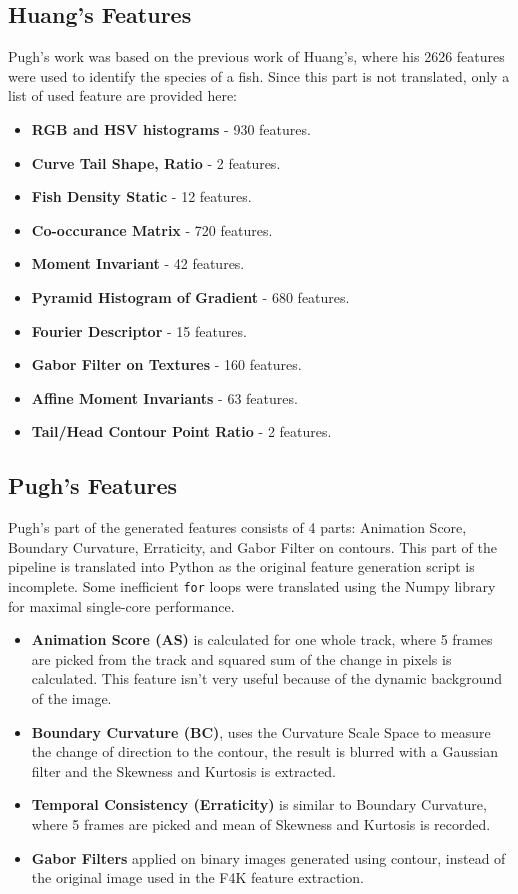 \documentclass[bsc,frontabs,twoside,fullspacing,parskip,deptreport]{infthesis}
\begin{document}
\subsection{Huang's Features}

Pugh's work was based on the previous work of Huang's\cite{Huang}, where his 2626 features were used to identify the species of a fish.
Since this part is not translated, only a list of used feature are provided here:
\begin{itemize}
\setlength{\parskip}{1pt}
\item \textbf{RGB and HSV histograms} - 930 features.
\item \textbf{Curve Tail Shape, Ratio} - 2 features.
\item \textbf{Fish Density Static} - 12 features.
\item \textbf{Co-occurance Matrix} - 720 features.
\item \textbf{Moment Invariant} - 42 features.
\item \textbf{Pyramid Histogram of Gradient} - 680 features.
\item \textbf{Fourier Descriptor} - 15 features.
\item \textbf{Gabor Filter on Textures} - 160 features.
\item \textbf{Affine Moment Invariants} - 63 features.
\item \textbf{Tail/Head Contour Point Ratio} - 2 features.
\end{itemize}

\subsection{Pugh's Features}

Pugh's part of the generated features consists of 4 parts: Animation Score, Boundary Curvature, Erraticity, and Gabor Filter on contours. 
This part of the pipeline is translated into Python as the original feature generation script is incomplete. Some inefficient {\tt for} loops were translated using the Numpy library for maximal single-core performance.

\begin{itemize}
\setlength{\parskip}{1pt}
\item
\textbf{Animation Score (AS)} is calculated for one whole track, where 5 frames are picked from the track and squared sum of the change in pixels is calculated. This feature isn't very useful because of the dynamic background of the image.
\item
\textbf{Boundary Curvature (BC)}, uses the Curvature Scale Space to measure the change of direction to the contour, the result is blurred with a Gaussian filter and the Skewness and Kurtosis is extracted. 
\item
\textbf{Temporal Consistency (Erraticity)} is similar to Boundary Curvature, where 5 frames are picked and mean of Skewness and Kurtosis is recorded.
\item
\textbf{Gabor Filters} applied on binary images generated using contour, instead of the original image used in the F4K feature extraction. 
\end{itemize}
\end{document}
